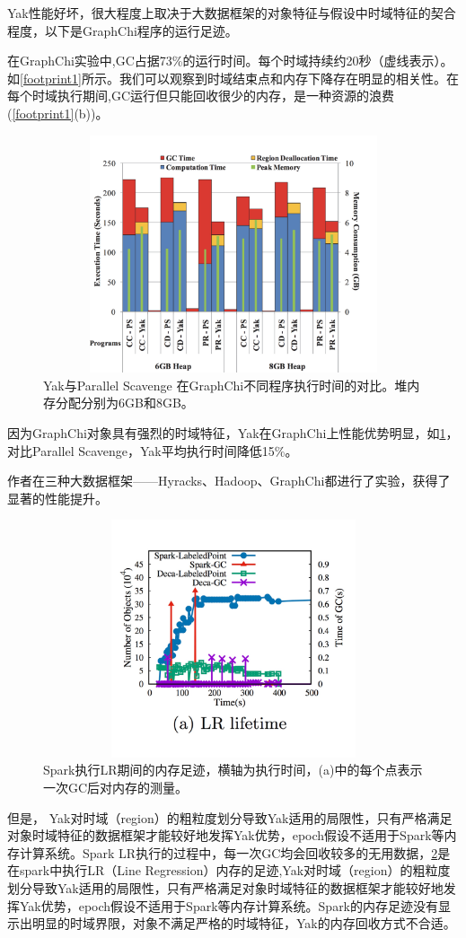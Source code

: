 Yak性能好坏，很大程度上取决于大数据框架的对象特征与假设中时域特征的契合程度，以下是GraphChi程序的运行足迹。

在GraphChi实验中,GC占据73\%的运行时间。每个时域持续约20秒（虚线表示）。如\ref{footprint1}所示。我们可以观察到时域结束点和内存下降存在明显的相关性。在每个时域执行期间,GC运行但只能回收很少的内存，是一种资源的浪费 (\ref{footprint1}(b))。

\begin{figure}[h]
    \centering
    \includegraphics[width=12cm,height=7cm]{figure/evaluation1.jpg}
    \caption{
        Yak与Parallel Scavenge 在GraphChi不同程序执行时间的对比。堆内存分配分别为6GB和8GB。
    }
    \label{evaluation1}
\end{figure}

因为GraphChi对象具有强烈的时域特征，Yak在GraphChi上性能优势明显，如\ref{evaluation1}，对比Parallel Scavenge，Yak平均执行时间降低15\%。

作者在三种大数据框架——Hyracks、Hadoop、GraphChi都进行了实验，获得了显著的性能提升。

\begin{figure}[h]
    \centering
    \includegraphics[width=12cm,height=7cm]{figure/evaluation2.png}
    \caption{
        Spark执行LR期间的内存足迹，横轴为执行时间，(a)中的每个点表示一次GC后对内存的测量。
    }
    \label{evaluation2}
\end{figure}
但是， Yak对时域（region）的粗粒度划分导致Yak适用的局限性，只有严格满足对象时域特征的数据框架才能较好地发挥Yak优势，epoch假设不适用于Spark等内存计算系统。Spark LR执行的过程中，每一次GC均会回收较多的无用数据，\ref{evaluation2}是在spark中执行LR（Line Regression）内存的足迹,Yak对时域（region）的粗粒度划分导致Yak适用的局限性，只有严格满足对象时域特征的数据框架才能较好地发挥Yak优势，epoch假设不适用于Spark等内存计算系统。Spark的内存足迹没有显示出明显的时域界限，对象不满足严格的时域特征，Yak的内存回收方式不合适。

